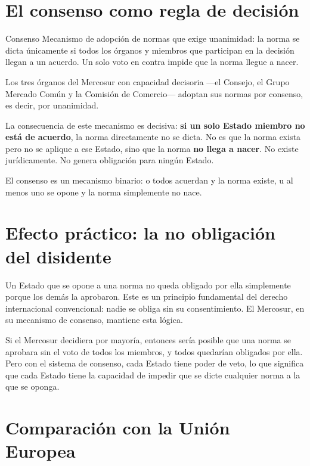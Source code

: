 \documentclass[12pt,oneside]{book}
\begin{document}
\section{El consenso como regla de decisión}

\begin{definition}{Consenso}
Mecanismo de adopción de normas que exige unanimidad: la norma se dicta únicamente si todos los órganos y miembros que participan en la decisión llegan a un acuerdo. Un solo voto en contra impide que la norma llegue a nacer.
\end{definition}

Los tres órganos del Mercosur con capacidad decisoria ---el Consejo, el Grupo Mercado Común y la Comisión de Comercio--- adoptan sus normas por consenso, es decir, por unanimidad.

La consecuencia de este mecanismo es decisiva: \textbf{si un solo Estado miembro no está de acuerdo}, la norma directamente no se dicta. No es que la norma exista pero no se aplique a ese Estado, sino que la norma \textbf{no llega a nacer}. No existe jurídicamente. No genera obligación para ningún Estado.

\begin{important}
El consenso es un mecanismo binario: o todos acuerdan y la norma existe, u al menos uno se opone y la norma simplemente no nace.
\end{important}

\section{Efecto práctico: la no obligación del disidente}

Un Estado que se opone a una norma no queda obligado por ella simplemente porque los demás la aprobaron. Este es un principio fundamental del derecho internacional convencional: nadie se obliga sin su consentimiento. El Mercosur, en su mecanismo de consenso, mantiene esta lógica.

Si el Mercosur decidiera por mayoría, entonces sería posible que una norma se aprobara sin el voto de todos los miembros, y todos quedarían obligados por ella. Pero con el sistema de consenso, cada Estado tiene poder de veto, lo que significa que cada Estado tiene la capacidad de impedir que se dicte cualquier norma a la que se oponga.

\section{Comparación con la Unión Europea}
\end{document}
